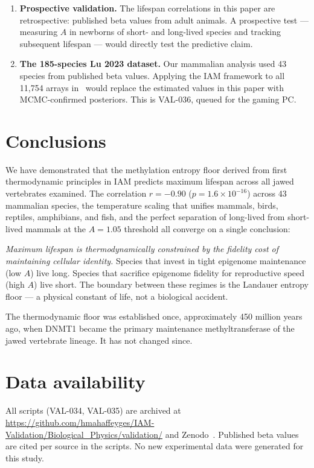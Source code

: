 \documentclass[11pt,a4paper]{article}
\newcommand{\Ascore}{A}
\begin{document}
\begin{enumerate}
\item \textbf{Prospective validation.} The lifespan correlations in this paper
are retrospective: published beta values from adult animals. A prospective
test --- measuring $\Ascore$ in newborns of short- and long-lived species
and tracking subsequent lifespan --- would directly test the predictive claim.

\item \textbf{The 185-species Lu 2023 dataset.} Our mammalian analysis used
43 species from published beta values. Applying the IAM framework to all 11,754
arrays in~\citet{Lu2023} would replace the estimated values in this paper with
MCMC-confirmed posteriors. This is VAL-036, queued for the gaming PC.
\end{enumerate}

\section{Conclusions}

We have demonstrated that the methylation entropy floor derived from first
thermodynamic principles in IAM predicts maximum lifespan across all jawed
vertebrates examined. The correlation $r = -0.90$ ($p = 1.6 \times 10^{-16}$)
across 43 mammalian species, the temperature scaling that unifies mammals,
birds, reptiles, amphibians, and fish, and the perfect separation of long-lived
from short-lived mammals at the $\Ascore = 1.05$ threshold all converge on
a single conclusion:

\emph{Maximum lifespan is thermodynamically constrained by the fidelity cost
of maintaining cellular identity.} Species that invest in tight epigenome
maintenance (low $\Ascore$) live long. Species that sacrifice epigenome fidelity
for reproductive speed (high $\Ascore$) live short. The boundary between these
regimes is the Landauer entropy floor --- a physical constant of life, not a
biological accident.

The thermodynamic floor was established once, approximately 450 million years
ago, when DNMT1 became the primary maintenance methyltransferase of the jawed
vertebrate lineage. It has not changed since.

\section*{Data availability}

All scripts (VAL-034, VAL-035) are archived at
\url{https://github.com/hmahaffeyges/IAM-Validation/Biological_Physics/validation/}
and Zenodo~\citep{Mahaffey2026}. Published beta values are cited per source
in the scripts. No new experimental data were generated for this study.
\end{document}

